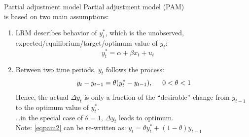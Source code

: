 \documentclass{beamer}
\begin{document}
\begin{frame}{Partial adjustment model}
Partial adjustment model (PAM) \\is based on two main assumptions:
\begin{enumerate}
\item LRM describes behavior of $y_t^{\ast}$, which is the unobserved, \\ 
expected/equilibrium/target/optimum value of $y_t$:
\begin{equation}
{y}_t^\ast = \alpha + \beta x_t + u_t  ~~~~~~~~  \label{eqpam1} 
\end{equation}
\item Between two time periods, $y_t$ follows the process:
\begin{equation}
y_t - y_{t-1} = \theta ( y_t^\ast-y_{t-1}), \hspace{0.5cm} 0 < \theta < 1 \label{eqpam2}
\end{equation}
Hence, the actual $\Delta y_t$ is only a fraction of the ``desirable'' change from $y_{t-1}$ to the optimum value of $y_t^\ast$.
\\ \dots in the special case of $\theta = 1$, $\Delta y_t$ leads to optimum.\\
\medskip
Note: \eqref{eqpam2} can be re-written as: $y_t= \theta {y}_t^\ast + (1-\theta)y_{t-1} $
\end{enumerate}

\end{frame}
\end{document}
